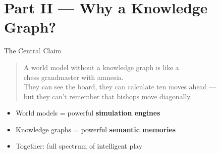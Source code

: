 \documentclass[aspectratio=169, 11pt]{beamer}
\begin{document}
\section{Part II --- Why a Knowledge Graph?}

\begin{frame}{The Central Claim}
  \begin{center}
    \Large
    \begin{quote}
      A world model without a knowledge graph is like a\\
      chess grandmaster with amnesia.\\[6pt]
      \normalsize They can see the board, they can calculate ten moves ahead ---\\
      but they can't remember that bishops move diagonally.
    \end{quote}
  \end{center}
  \vspace{0.5cm}
  \begin{itemize}
    \item World models = powerful \textbf{simulation engines}
    \item Knowledge graphs = powerful \textbf{semantic memories}
    \item Together: full spectrum of intelligent play
  \end{itemize}
\end{frame}
\end{document}
